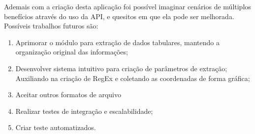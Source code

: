 Ademais com a criação desta aplicação foi possível imaginar cenários de múltiplos benefícios através do uso da API, e quesitos em que ela pode ser melhorada. Possíveis trabalhos futuros são:
\begin{enumerate}
    \item Aprimorar o módulo para extração de dados tabulares, mantendo a organização original das informações;
    \item Desenvolver sistema intuitivo para criação de parâmetros de extração; Auxiliando na criação de RegEx e coletando as coordenadas de forma gráfica;
    \item Aceitar outros formatos de arquivo \item Realizar testes de integração e escalabilidade;
    \item Criar teste automatizados.
\end{enumerate}